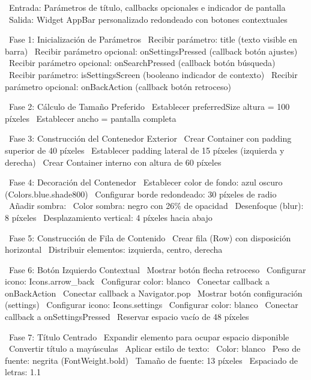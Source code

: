 \begin{algorithmic}[1]
\State~Entrada: Parámetros de título, callbacks opcionales e indicador de pantalla
\State~Salida: Widget AppBar personalizado redondeado con botones contextuales

\State~Fase 1: Inicialización de Parámetros
\State~Recibir parámetro: title (texto visible en barra)
\State~Recibir parámetro opcional: onSettingsPressed (callback botón ajustes) %
\State~Recibir parámetro opcional: onSearchPressed (callback botón búsqueda) %
\State~Recibir parámetro: isSettingsScreen (booleano indicador de contexto) %
\State~Recibir parámetro opcional: onBackAction (callback botón retroceso)

\State~Fase 2: Cálculo de Tamaño Preferido
\State~Establecer preferredSize altura = 100 píxeles
\State~Establecer ancho = pantalla completa

\State~Fase 3: Construcción del Contenedor Exterior
\State~Crear Container con padding superior de 40 píxeles
\State~Establecer padding lateral de 15 píxeles (izquierda y derecha) %
\State~Crear Container interno con altura de 60 píxeles

\State~Fase 4: Decoración del Contenedor
\State~Establecer color de fondo: azul oscuro (Colors.blue.shade800)
\State~Configurar borde redondeado: 30 píxeles de radio
\State~Añadir sombra:
\State~Color sombra: negro con 26\% de opacidad
\State~Desenfoque (blur): 8 píxeles
\State~Desplazamiento vertical: 4 píxeles hacia abajo

\State~Fase 5: Construcción de Fila de Contenido
\State~Crear fila (Row) con disposición horizontal
\State~Distribuir elementos: izquierda, centro, derecha

\State~Fase 6: Botón Izquierdo Contextual
%
    \State~Mostrar botón flecha retroceso
    \State~Configurar icono: Icons.arrow\_back %
    \State~Configurar color: blanco
        \State~Conectar callback a onBackAction
    \Else%
        \State~Conectar callback a Navigator.pop
    \EndIf%
\Else%
        \State~Mostrar botón configuración (settings)
        \State~Configurar icono: Icons.settings
        \State~Configurar color: blanco
        \State~Conectar callback a onSettingsPressed
    \Else%
        \State~Reservar espacio vacío de 48 píxeles
    \EndIf%
\EndIf%

\State~Fase 7: Título Centrado
\State~Expandir elemento para ocupar espacio disponible
\State~Convertir título a mayúsculas
\State~Aplicar estilo de texto:
\State~Color: blanco
\State~Peso de fuente: negrita (FontWeight.bold)
\State~Tamaño de fuente: 13 píxeles
\State~Espaciado de letras: 1.1


\end{algorithmic}
